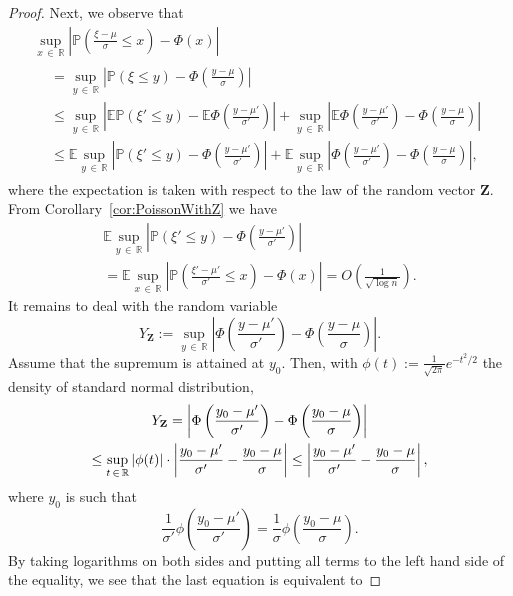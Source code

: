 \documentclass[AHL,Unicode,longabstracts,published]{cedram}
\newcommand{\bfZ}{\mathbf{Z}}
\newcommand{\bbR}{\mathbb{R}}
\newcommand{\bbE}{\mathbb{E}}
\newcommand{\bbP}{\mathbb{P}}
\begin{document}
\begin{proof}
Next, we observe that
\begin{multline}\label{eq:14.05.21_2}
\sup_{x\,\in\,\bbR} \left| \bbP\left(\frac {\xi-\mu}{\sigma}\leq x\right) - \Phi(x)\right|\\
\begin{aligned}
& = 
\sup_{y\,\in\,\bbR} \left| \bbP(\xi\leq y) - \Phi\left(\frac {y-\mu}{\sigma}\right)\right|
\\ &\leq
\sup_{y\,\in\,\bbR} \left| \bbE \bbP(\xi'\leq y) - \bbE \Phi\left(\frac {y-\mu'}{\sigma'}\right)\right| +
\sup_{y\,\in\,\bbR}\left|\bbE \Phi\left(\frac {y-\mu'}{\sigma'}\right) - \Phi\left(\frac {y-\mu}{\sigma}\right)\right| \\
& \leq
\bbE \sup_{y\,\in\,\bbR} \left| \bbP(\xi'\leq y) - \Phi\left(\frac {y-\mu'}{\sigma'}\right)\right| +
\bbE \sup_{y\,\in\,\bbR} \left|\Phi\left(\frac {y-\mu'}{\sigma'}\right) - \Phi\left(\frac {y-\mu}{\sigma}\right)\right|,
\end{aligned}
\end{multline}
where the expectation is taken with respect to the law of the random vector ${\bfZ}$. From Corollary~\ref{cor:PoissonWithZ} we have
\begin{multline}\label{eq:14.05.21_3}
\bbE \sup_{y\,\in\,\bbR} \left| \bbP(\xi'\leq y) - \Phi\left(\frac {y-\mu'}{\sigma'}\right)\right|\\
=\bbE \sup_{x\,\in\,\bbR} \left| \bbP\left(\frac {\xi'-\mu'}{\sigma'}\leq x\right) - \Phi(x)\right| = O\left(\frac{1}{\sqrt{\log n}}\right).
\end{multline}
It remains to deal with the random variable
\[
Y_{\bfZ}:=\sup_{y\,\in\,\bbR} \left|\Phi\left(\frac {y-\mu'}{\sigma'}\right) - \Phi\left(\frac {y-\mu}{\sigma}\right)\right|.
\]
Assume that the supremum is attained at $y_0$. Then, with $\phi(t):=\frac{1}{\sqrt{2\pi}}e^{-t^2/2}$ the density of standard normal distribution,
\begin{multline}\label{eq:18-05-21a}
Y_{\bf{Z}}=\left|\Phi\left(\frac {y_0-\mu'}{\sigma'}\right) - \Phi\left(\frac {y_0-\mu}{\sigma}\right)\right|\\
\leq \sup_{t\,\in\,\bbR}|\phi(t)|\cdot \left|\frac {y_0-\mu'}{\sigma'} - \frac {y_0-\mu}{\sigma}\right|\leq\left|\frac {y_0-\mu'}{\sigma'} - \frac {y_0-\mu}{\sigma}\right|,
\end{multline}
where $y_0$ is such that
\[
\frac{1}{\sigma'}\phi\left(\frac {y_0-\mu'}{\sigma'}\right) = \frac{1}{\sigma}\phi\left(\frac {y_0-\mu}{\sigma}\right).
\]
By taking logarithms on both sides and putting all terms to the left hand side of the equality, we see that the last equation is equivalent to

\end{proof}
\end{document}
